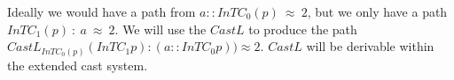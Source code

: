 Ideally we would have a path from $a::InTC_{0}(p)\ \approx\ 2$, but we only have a path $InTC_{1}(p)\ :\ a\ \approx\ 2$.
We will use the $CastL$ to produce the path $CastL_{InTC_{0}(p)}\left(InTC_{1}p\right):(a::InTC_{0}p))\approx2$.
$CastL$ will be derivable within the extended cast system.
 
 
 
 
 
 
 
 
 
